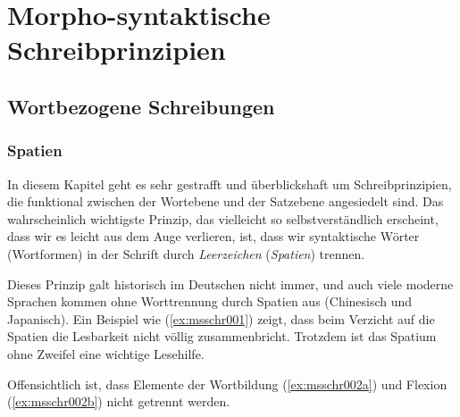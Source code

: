 \chapter{Morpho-syntaktische Schreibprinzipien}

\label{sec:andereschrift}

\section{Wortbezogene Schreibungen}

\subsection{Spatien}

\label{sec:spatien}

In diesem Kapitel geht es sehr gestrafft und überblickshaft um Schreibprinzipien, die funktional zwischen der Wortebene und der Satzebene angesiedelt sind.
Das wahrscheinlich wichtigste Prinzip, das vielleicht so selbstverständlich erscheint, dass wir es leicht aus dem Auge verlieren, ist, dass wir syntaktische Wörter (Wortformen) in der Schrift durch \textit{Leerzeichen} (\textit{Spatien}) trennen.


Dieses Prinzip galt historisch im Deutschen nicht immer, und auch viele moderne Sprachen kommen ohne Worttrennung durch Spatien aus (\zB Chinesisch und Japanisch).
Ein Beispiel wie (\ref{ex:msschr001}) zeigt, dass beim Verzicht auf die Spatien die Lesbarkeit nicht völlig zusammenbricht.
Trotzdem ist das Spatium ohne Zweifel eine wichtige Lesehilfe.

\begin{exe}
\end{exe}

Offensichtlich ist, dass Elemente der Wortbildung (\ref{ex:msschr002a}) und Flexion (\ref{ex:msschr002b}) nicht getrennt werden.

\begin{exe}
  \ex\label{ex:msschr002} 
  \begin{xlist}
  \end{xlist}
\end{exe}

